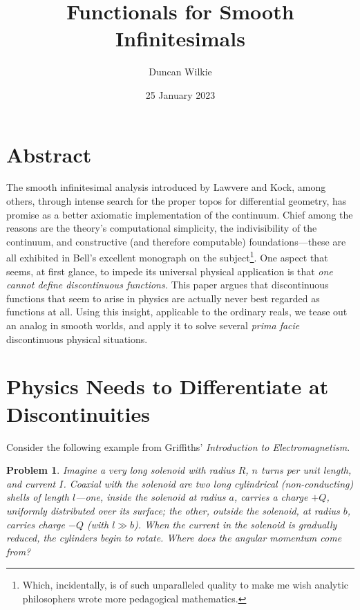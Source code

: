 \documentclass{article}
\title{Functionals for Smooth Infinitesimals}
\author{Duncan Wilkie}
\date{25 January 2023}
\newtheorem{plm}{Problem}
\begin{document}
\maketitle

\section{Abstract}

The smooth infinitesimal analysis introduced by Lawvere and Kock, among others,
through intense search for the proper topos for differential geometry, has promise as a better axiomatic implementation of the continuum.
Chief among the reasons are the theory's computational simplicity, the indivisibility of the continuum, and constructive (and therefore computable)
foundations---these are all exhibited in Bell's excellent monograph on the subject\footnote
{
  Which, incidentally, is of such unparalleled quality to make me wish analytic philosophers wrote more pedagogical mathematics.
}.
One aspect that seems, at first glance, to impede its universal physical application is that \textit{one cannot define discontinuous functions.}
This paper argues that  discontinuous functions that seem to arise in physics are actually never best regarded as functions at all.
Using this insight, applicable to the ordinary reals, we tease out an analog in smooth worlds, and apply it to solve several \textit{prima facie}
discontinuous physical situations.

\section{Physics Needs to Differentiate at Discontinuities}

Consider the following example from Griffiths' \textit{Introduction to Electromagnetism}.

\begin{plm}
  Imagine a very long solenoid with radius $R$, $n$ turns per unit length, and current $I$.
  Coaxial with the solenoid are two long cylindrical (non-conducting) shells of length $l$---one, \textit{inside} the solenoid at radius $a$,
  carries a charge $+Q$, uniformly distributed over its surface; the other, \textit{outside} the solenoid, at radius $b$,
  carries charge $-Q$ (with $l \gg b$).
  When the current in the solenoid is gradually reduced, the cylinders begin to rotate.
  Where does the angular momentum come from? %
\end{plm}
\end{document}
